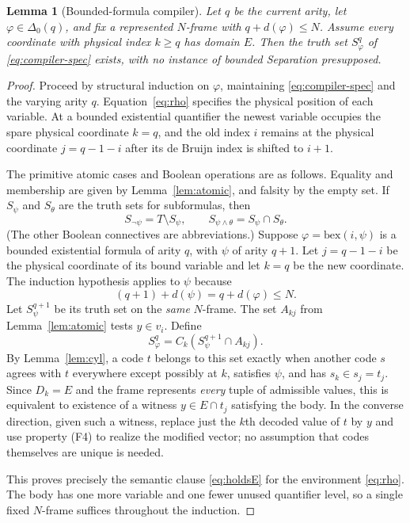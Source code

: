 \documentclass[11pt,a4paper]{article}
\numberwithin{equation}{section}
\newtheorem{lemma}[theorem]{Lemma}
\newcommand{\Dzero}{\Delta_0}
\begin{document}
\begin{lemma}[Bounded-formula compiler]\label{lem:compiler}
Let $q$ be the current arity, let $\varphi\in\Dzero(q)$, and fix a represented $N$-frame with $q+d(\varphi)\le N$.  Assume every coordinate with physical index $k\ge q$ has domain $E$.  Then the truth set $S^q_\varphi$ of \eqref{eq:compiler-spec} exists, with no instance of bounded Separation presupposed.
\end{lemma}
\begin{proof}
Proceed by structural induction on $\varphi$, maintaining \eqref{eq:compiler-spec} and the varying arity $q$.  Equation~\eqref{eq:rho} specifies the physical position of each variable.  At a bounded existential quantifier the newest variable occupies the spare physical coordinate $k=q$, and the old index $i$ remains at the physical coordinate $j=q-1-i$ after its de Bruijn index is shifted to $i+1$.

The primitive atomic cases and Boolean operations are as follows.  Equality and membership are given by Lemma~\ref{lem:atomic}, and falsity by the empty set.  If $S_\psi$ and $S_\theta$ are the truth sets for subformulas, then
\[
S_{\neg\psi}=T\setminus S_\psi,
\qquad S_{\psi\land\theta}=S_\psi\cap S_\theta.
\]
(The other Boolean connectives are abbreviations.)  Suppose $\varphi=\mathrm{bex}(i,\psi)$ is a bounded existential formula of arity $q$, with $\psi$ of arity $q+1$.  Let $j=q-1-i$ be the physical coordinate of its bound variable and let $k=q$ be the new coordinate.  The induction hypothesis applies to $\psi$ because
\[
(q+1)+d(\psi)=q+d(\varphi)\le N.
\]
Let $S^{q+1}_\psi$ be its truth set on the \emph{same} $N$-frame.  The set $A_{kj}$ from Lemma~\ref{lem:atomic} tests $y\in v_i$.  Define
\begin{equation}\label{eq:bex}
S^q_\varphi=C_k(S^{q+1}_\psi\cap A_{kj}).
\end{equation}
By Lemma~\ref{lem:cyl}, a code $t$ belongs to this set exactly when another code $s$ agrees with $t$ everywhere except possibly at $k$, satisfies $\psi$, and has $s_k\in s_j=t_j$.  Since $D_k=E$ and the frame represents \emph{every} tuple of admissible values, this is equivalent to existence of a witness $y\in E\cap t_j$ satisfying the body.  In the converse direction, given such a witness, replace just the $k$th decoded value of $t$ by $y$ and use property (F4) to realize the modified vector; no assumption that codes themselves are unique is needed.

This proves precisely the semantic clause \eqref{eq:holdsE} for the environment \eqref{eq:rho}.  The body has one more variable and one fewer unused quantifier level, so a single fixed $N$-frame suffices throughout the induction.
\end{proof}
\end{document}
